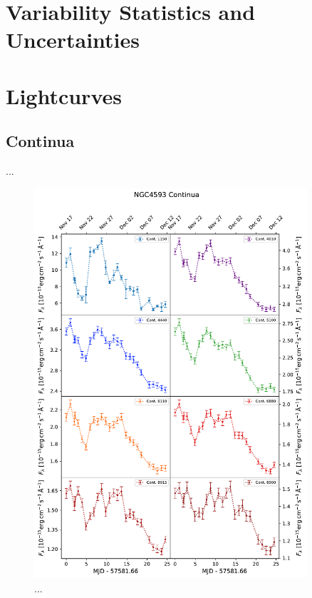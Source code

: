 \section{Variability Statistics and Uncertainties}


\section{Lightcurves}




\subsection{Continua}
...
\begin{figure}[!ht]
	\centering
	\includegraphics[width=0.9\textwidth]{pictures/Chapter4/lightcurves/NGC4593_Continua.pdf}
	\caption{...}
	\label{fig:continua_lightcurves}
\end{figure}

